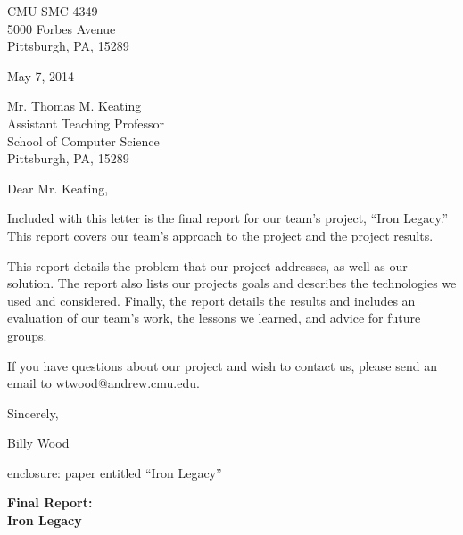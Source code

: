 \documentclass{article}
\begin{document}
\thispagestyle{empty}
\noindent
CMU SMC 4349\\
5000 Forbes Avenue\\
Pittsburgh, PA, 15289

\vspace{2em}

\noindent
May 7, 2014

\vspace{2em}

\noindent
Mr. Thomas M. Keating\\
Assistant Teaching Professor\\
School of Computer Science\\
Pittsburgh, PA, 15289

\vspace{2em}

\noindent
Dear Mr. Keating,

\vspace{2em}

\noindent
Included with this letter is the final report for our team's project,
    ``Iron Legacy.''
     This report covers our team's approach to the project and the project
     results.

\vspace{2em}

\noindent
This report details the problem that our project addresses, 
    as well as our solution.
    The report also lists our projects goals
    and describes the technologies we used and considered.
    Finally, the report details the results and includes an evaluation of our
    team's work, the lessons we learned, and advice for future groups.

\vspace{2em}

\noindent
If you have questions about our project and wish to contact us,
    please send an email to wtwood@andrew.cmu.edu.

\vspace{2em}

\noindent
Sincerely,

\vspace{4em}

\noindent
Billy Wood

\vfill

\noindent
enclosure: paper entitled ``Iron Legacy''

\clearpage

\thispagestyle{empty}

\begin{center}
\bf\large
Final Report:\\
\Huge
Iron Legacy
\end{center}
\end{document}
